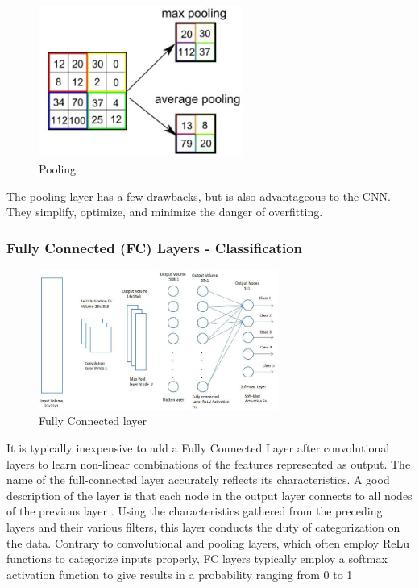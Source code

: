 \documentclass[a4paper, 12pt]{article}
\begin{document}
\begin{figure}[H]
    \centering
    \includegraphics[width=0.6\textwidth]{Pooling.png}
    \caption{Pooling}
    \label{Figure Pooling}
\end{figure}

The pooling layer has a few drawbacks, but is also advantageous to the CNN. They simplify, optimize, and minimize the danger of overfitting.

\subsubsection{Fully Connected (FC) Layers - Classification}

\begin{figure}[H]
    \centering
    \includegraphics[width=0.7\textwidth]{Fully connected.jpeg}
    \caption{Fully Connected layer \citep{towardScienceCnn}}
    \label{Figure FC layer}
\end{figure}

It is typically inexpensive to add a Fully Connected Layer after convolutional layers to learn non-linear combinations of the features represented as output. The name of the full-connected layer accurately reflects its characteristics. A good description of the layer is that each node in the output layer connects to all nodes of the previous layer \citep{8308186}. Using the characteristics gathered from the preceding layers and their various filters, this layer conducts the duty of categorization on the data. Contrary to convolutional and pooling layers, which often employ ReLu functions to categorize inputs properly, FC layers typically employ a softmax activation function to give results in a probability ranging from 0 to 1 \citep{ibmConvNet}
\end{document}
